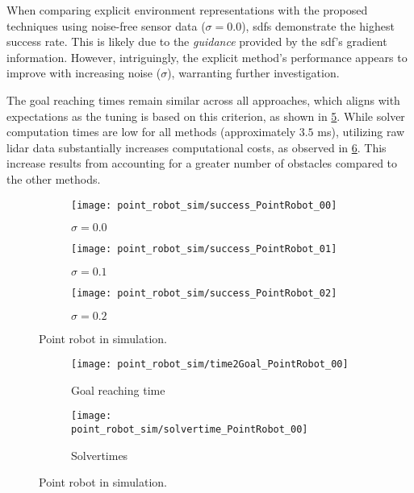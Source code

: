 When comparing explicit environment representations with the proposed techniques
using noise-free sensor data ($\sigma=0.0$), \acp{sdf} demonstrate the highest
success rate. This is likely due to the \textit{guidance} provided by the
\ac{sdf}'s gradient information. However, intriguingly, the explicit method's
performance appears to improve with increasing noise ($\sigma$), warranting
further investigation.

The goal reaching times remain similar across all approaches, which aligns with
expectations as the tuning is based on this criterion, as shown in
\cref{subfig:point_robot_sim_time2Goal}. While solver computation times are low
for all methods (approximately $3.5$ ms), utilizing raw lidar data substantially
increases computational costs, as observed in
\cref{subfig:point_robot_sim_solvertimes}. This increase results from accounting
for a greater number of obstacles compared to the other methods.


\begin{figure}[h]
  \centering
  \begin{subfigure}{0.33\linewidth}
    \centering
  \texttt{[image: point\_robot\_sim/success\_PointRobot\_00]}
    \caption{$\sigma = 0.0$}%
    \label{subfig:point_robot_sim_sucess_noise_00}
  \end{subfigure}%
  \begin{subfigure}{0.33\linewidth}
    \centering
    \texttt{[image: point\_robot\_sim/success\_PointRobot\_01]}
    \caption{$\sigma=0.1$}%
    \label{subfig:point_robot_sim_success_noise_01}
  \end{subfigure}%
  \begin{subfigure}{0.33\linewidth}
    \centering
    \texttt{[image: point\_robot\_sim/success\_PointRobot\_02]}
    \caption{$\sigma=0.2$}%
    \label{subfig:point_robot_sim_success_noise_02}
  \end{subfigure}%
  \caption{Point robot in simulation.
  }%
  \label{fig:point_robot_sim_success}
\end{figure}

\begin{figure}[h]
  \centering
  \begin{subfigure}{0.5\linewidth}
    \centering
  \texttt{[image: point\_robot\_sim/time2Goal\_PointRobot\_00]}
    \caption{Goal reaching time}%
    \label{subfig:point_robot_sim_time2Goal}
  \end{subfigure}%
  \begin{subfigure}{0.5\linewidth}
    \centering
    \texttt{[image: point\_robot\_sim/solvertime\_PointRobot\_00]}
    \caption{Solvertimes}%
    \label{subfig:point_robot_sim_solvertimes}
  \end{subfigure}%
  \caption{Point robot in simulation.
  }%
  \label{fig:point_robot_sim_metrics}
\end{figure}

